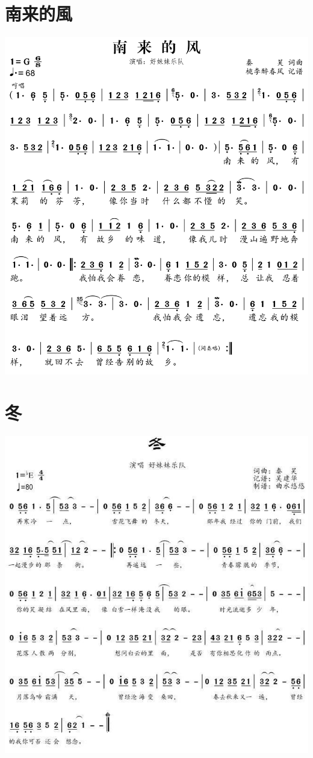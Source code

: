 \documentclass[cn,pad,twocol]{elegantbook}
\begin{document}
\section{南来的風}  \includegraphics[width=\textwidth]{dongxiao/20200516-好妹妹-南来的风.jpg} 
\section{冬}  \includegraphics[width=\textwidth]{dongxiao/20200516-好妹妹-冬.jpg}
\end{document}
